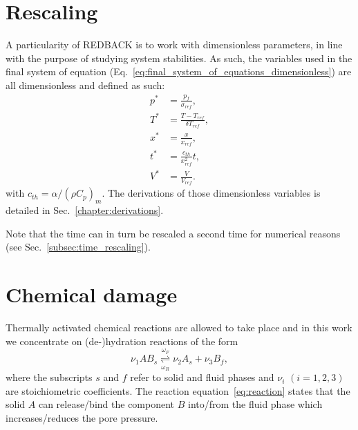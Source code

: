 \documentclass[]{scrreprt}
\newcommand{\redback}{{REDBACK}}
\begin{document}
\section{Rescaling}
\label{sec:rescaling}
A particularity of \redback{} is to work with dimensionless parameters, in line with the purpose of studying system stabilities. As such, the variables used in the final system of equation (Eq.~\ref{eq:final_system_of_equations_dimensionless}) are all dimensionless and defined as such:
\begin{subequations}
  \label{eq:dimensionless_defs}
  \begin{align}
  p^* &= \frac{p_f}{\sigma_{ref}}, \\   
  T^* &= \frac{T-T_{ref}}{\delta T_{ref}}, \\   
  x^* &= \frac{x}{x_{ref}}, \\   
  t^* &= \frac{c_{th}}{x^2_{ref}}t, \\   
  V^* &= \frac{V}{V_{ref}}.
  \end{align}
\end{subequations}
with $c_{th} = \alpha / (\rho C_p)_m$. The derivations of those dimensionless variables is detailed in Sec.~\ref{chapter:derivations}.

Note that the time can in turn be rescaled a second time for numerical reasons (see Sec.~\ref{subsec:time_rescaling}).


\section{Chemical damage}
\label{sec:chem_damage}

Thermally activated chemical reactions are allowed to take place and
in this work we concentrate on (de-)hydration reactions of the form
\begin{equation}
  \label{eq:reaction}
  \nu_1 AB_{s} 
  \overset{\omega_F}{\underset{\omega_R}{\rightleftharpoons}} \nu_2 A_{s} + \nu_3 B_{f},
\end{equation} 
where the subscripts $s$ and $f$ refer to solid and fluid phases and $\nu_i$
$(i=1,2,3)$ are stoichiometric coefficients.  The reaction
equation~\eqref{eq:reaction} states that the solid $A$ can release/bind the
component $B$ into/from the fluid phase which increases/reduces the pore pressure.
\end{document}
